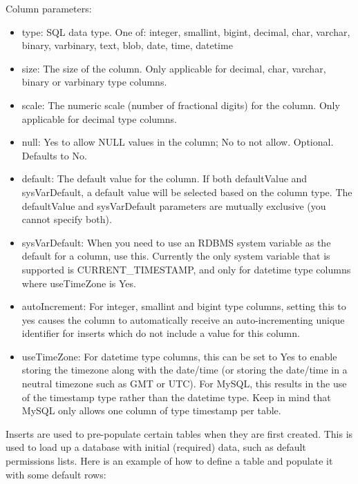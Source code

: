\documentclass[letterpaper,10pt,english]{sphinxmanual}
\begin{document}
Column parameters:
\begin{itemize}
\item {} 
type: SQL data type. One of: integer, smallint, bigint, decimal, char, varchar, binary, varbinary,
text, blob, date, time, datetime

\item {} 
size: The size of the column.  Only applicable for decimal, char, varchar, binary or varbinary
type columns.

\item {} 
scale: The numeric scale (number of fractional digits) for the column.  Only applicable for
decimal type columns.

\item {} 
null: Yes to allow NULL values in the column; No to not allow.  Optional.  Defaults to No.

\item {} 
default: The default value for the column.  If both defaultValue and sysVarDefault, a default
value will be selected based on the column type.  The defaultValue and sysVarDefault parameters
are mutually exclusive (you cannot specify both).

\item {} 
sysVarDefault: When you need to use an RDBMS system variable as the default for a column, use
this.  Currently the only system variable that is supported is CURRENT\_TIMESTAMP, and only for
datetime type columns where useTimeZone is Yes.

\item {} 
autoIncrement: For integer, smallint and bigint type columns, setting this to yes causes the
column to automatically receive an auto-incrementing unique identifier for inserts which do not
include a value for this column.

\item {} 
useTimeZone: For datetime type columns, this can be set to Yes to enable storing the timezone
along with the date/time (or storing the date/time in a neutral timezone such as GMT or UTC).  For
MySQL, this results in the use of the timestamp type rather than the datetime type.  Keep in mind
that MySQL only allows one column of type timestamp per table.

\end{itemize}

Inserts are used to pre-populate certain tables when they are first created.  This is used to load
up a database with initial (required) data, such as default permissions lists.  Here is an example
of how to define a table and populate it with some default rows:
\end{document}
